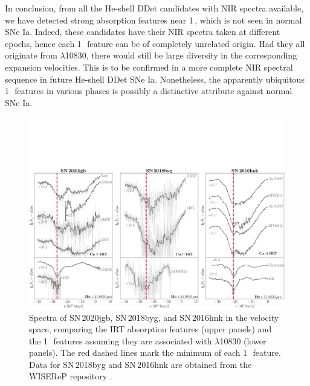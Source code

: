\documentclass[twocolumn]{aastex631}
\newcommand{\sn}{SN\,2020jgb}
\begin{document}
In conclusion, from all the He-shell DDet candidates with NIR spectra available, we have detected strong absorption features near 1\,\micron, which is not seen in normal SNe Ia. Indeed, these candidates have their NIR spectra taken at different epochs, hence each 1\,\micron\ feature can be of completely unrelated origin. Had they all originate from  $\lambda$10830, there would still be large diversity in the corresponding expansion velocities. This is to be confirmed in a more complete NIR spectral sequence in future He-shell DDet SNe Ia. Nonetheless, the apparently ubiquitous 1\,\micron\ features in various phases is possibly a distinctive attribute against normal SNe Ia.

\begin{figure}
    \centering
    \includegraphics[width=\textwidth]{CaII_HeI_hvf.pdf}
    \caption{Spectra of \sn, SN\,2018byg, and SN\,2016hnk in the velocity space, comparing the  IRT absorption features (upper panels) and the 1\,\micron\ features assuming they are associated with  $\lambda$10830 (lower panels). The red dashed lines mark the minimum of each 1\,\micron\ feature. Data for SN\,2018byg and SN\,2016hnk are obtained from the WISEReP repository \citep{wiserep_2012}.}
    \label{fig:hvf_comp}
\end{figure}
\end{document}
